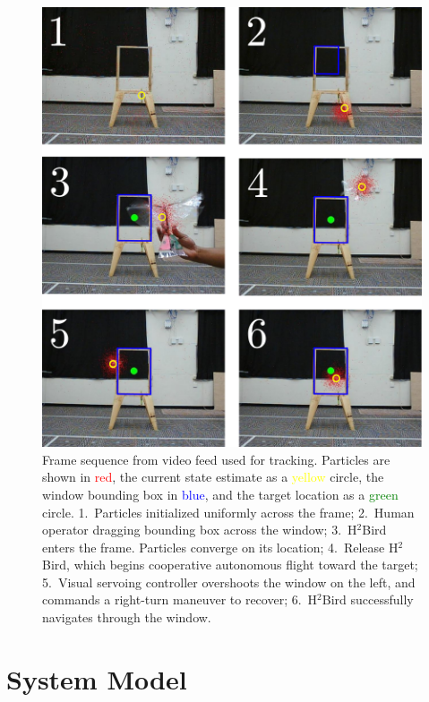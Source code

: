 \documentclass{aamas2013}
\begin{document}
\begin{figure}[tb]
\centering
\includegraphics[width=\linewidth]{figures/pf_screencap.pdf}
\caption{Frame sequence from video feed used for tracking. Particles 
are shown in \textcolor{red}{red}, the current state estimate as a 
\textcolor{yellow}{yellow} circle, the window bounding box in
\textcolor{blue}{blue}, and the target location as a \textcolor{green}{green} 
circle. 1.~Particles initialized uniformly across the frame; 2.~Human operator 
dragging bounding box across the window; 3.~H$^2$Bird enters the frame. 
Particles converge on its location; 4.~Release H$^2$Bird, which 
begins cooperative autonomous flight toward the target; 5.~Visual servoing 
controller overshoots the window on the left, and commands a right-turn 
maneuver to recover; 6.~H$^2$Bird successfully navigates through the window.}
\label{fig:pf_screencap}
\end{figure}

\section{System Model}
\label{sec:system_model}
\end{document}
